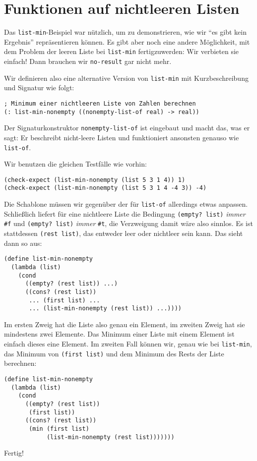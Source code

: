 \section{Funktionen auf nichtleeren Listen}

Das \lstinline{list-min}-Beispiel war nützlich, um zu demonstrieren,
wie wir "`es gibt kein Ergebnis"' repräsentieren können.  Es gibt aber
noch eine andere Möglichkeit, mit dem Problem der leeren Liste bei
\lstinline{list-min} fertigzuwerden: Wir verbieten sie einfach!  Dann
brauchen wir \lstinline{no-result} gar nicht mehr.

Wir definieren also eine alternative Version von \lstinline{list-min}
mit Kurzbeschreibung und Signatur wie folgt:
%
\begin{lstlisting}
; Minimum einer nichtleeren Liste von Zahlen berechnen
(: list-min-nonempty ((nonempty-list-of real) -> real))
\end{lstlisting}
%
Der Signaturkonstruktor \lstinline{nonempty-list-of} ist eingebaut und
macht das, was er sagt: Er beschreibt nicht-leere Listen und
funktioniert ansonsten genauso wie \lstinline{list-of}.

Wir benutzen die gleichen Testfälle wie vorhin:
%
\begin{lstlisting}
(check-expect (list-min-nonempty (list 5 3 1 4)) 1)
(check-expect (list-min-nonempty (list 5 3 1 4 -4 3)) -4)
\end{lstlisting}
%
Die Schablone müssen wir gegenüber der für \lstinline{list-of}
allerdings etwas anpassen.  Schließlich liefert für eine nichtleere
Liste die Bedingung \lstinline{(empty? list)} \emph{immer}
\lstinline{#f} und \lstinline{(empty? list)} \emph{immer}
\lstinline{#t}, die Verzweigung damit wäre also sinnlos.  Es ist
stattdessen \lstinline{(rest list)}, das entweder leer oder nichtleer
sein kann.  Das sieht dann so aus:
%
\begin{lstlisting}
(define list-min-nonempty
  (lambda (list)
    (cond
      ((empty? (rest list)) ...)
      ((cons? (rest list))
       ... (first list) ...
       ... (list-min-nonempty (rest list)) ...))))
\end{lstlisting}
%
Im ersten Zweig hat die Liste also genau ein Element, im zweiten Zweig
hat sie mindestens zwei Elemente.  Das Minimum einer Liste mit einem
Element ist einfach dieses eine Element.  Im zweiten Fall können wir,
genau wie bei \lstinline{list-min}, das Minimum von
\lstinline{(first list)} und dem Minimum des Rests der Liste
berechnen:
%
\begin{lstlisting}
(define list-min-nonempty
  (lambda (list)
    (cond
      ((empty? (rest list))
       (first list))
      ((cons? (rest list))
       (min (first list)
            (list-min-nonempty (rest list)))))))
\end{lstlisting}
%
Fertig!

